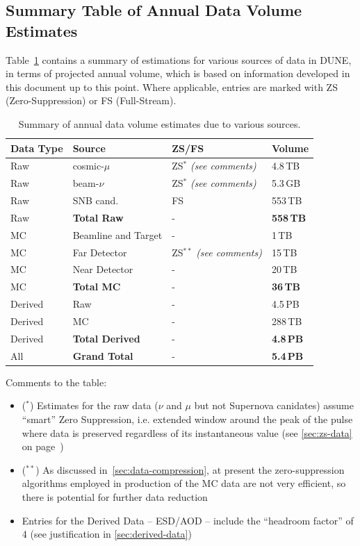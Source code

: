 \subsection{Summary Table of Annual Data Volume Estimates}
Table~\ref{tab:summary-data-table} contains a summary of estimations for various sources
of data in DUNE, in terms of projected annual volume, which is based on information developed in
this document up to this point. Where applicable, entries are marked with ZS (Zero-Suppression) or
FS (Full-Stream).
\begin{table}[ht!]
	\centering
	\begin{tabular}{| p{1.56in}| p{1.5in} | p{1.5in} | p{1.2in} |}
		\hline
		\textbf{Data Type} & \textbf{Source} & \textbf{ZS/FS} & \textbf{Volume} \\ \hline
		Raw & cosmic-$\mu$  & ZS$^*$ \textit{(see comments)}& 4.8\,TB \\	\hline
		Raw & beam-$\nu$  & ZS$^*$ \textit{(see comments)}& 5.3\,GB  \\	\hline
		Raw & SNB cand. & FS & 553\,TB \\	\hline \hline \hline
		Raw & \textbf{Total Raw} & - & \textbf{558\,TB} \\		\hline \hline \hline
		MC & Beamline and Target  & - & 1\,TB \\	\hline
		MC & Far Detector & ZS$^{**}$  \textit{(see comments)}  & 15\,TB \\		\hline
		MC & Near Detector & - &20\,TB \\ \hline \hline \hline
		MC & \textbf{Total MC} & - & \textbf{36\,TB} \\		\hline \hline \hline
		Derived &  Raw  & - & 4.5\,PB \\	\hline
		Derived &  MC  & - & 288\,TB \\	\hline  \hline \hline
		Derived & \textbf{Total Derived} & - & \textbf{4.8\,PB} \\		\hline \hline \hline
		All & \textbf{Grand Total} & - & \textbf{5.4\,PB} \\		\hline %
	\end{tabular}
	\caption{Summary of annual data volume estimates due to various sources.}
	\label{tab:summary-data-table}
\end{table}
Comments to the table:
\begin{itemize}
\item ($^*$) Estimates for the raw data ($\nu$ and $\mu$ but not Supernova canidates) assume ``smart'' Zero Suppression, i.e. extended
window around the peak of the pulse where data is preserved regardless of its instantaneous value (see \ref{sec:zs-data} on page~\pageref{sec:zs-data})

\item ($^{**}$) As discussed in~\ref{sec:data-compression}, at present the zero-suppression algorithms employed in production of the
MC data are not very efficient, so there is potential for further data reduction

\item Entries for the Derived Data -- ESD/AOD --  include the ``headroom factor'' of 4 (see justification in \ref{sec:derived-data})
\end{itemize}


